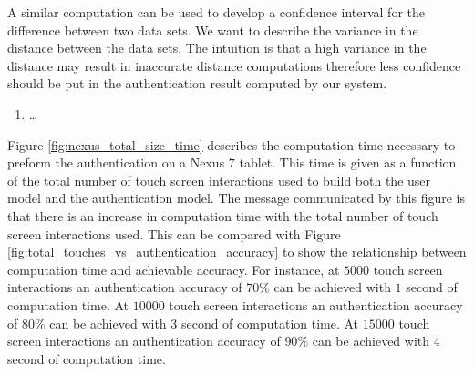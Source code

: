 A similar computation can be used to develop 
a confidence interval for the difference between two data sets.
%
We want to describe the variance in the distance 
between the data sets.
The intuition is that a high variance in the distance
may result in inaccurate distance computations therefore
less confidence should be put in the authentication result 
computed by our system.
%
\begin{enumerate}
\item \dots
\end{enumerate}



%
Figure \ref{fig:nexus_total_size_time} describes the
computation time necessary to preform the authentication on a Nexus $7$ tablet.
This time is given as a function of
the total number of touch screen interactions used to build
both the user model and the authentication model.
%
The message communicated by this figure is 
that there is an increase in computation time 
with the total number of touch screen interactions used.
%
This can be compared with 
Figure \ref{fig:total_touches_vs_authentication_accuracy}
to show the relationship between 
computation time and achievable accuracy.
%
For instance,
at $5000$ touch screen interactions an authentication accuracy of $70\%$
can be achieved with $1$ second of computation time.
At $10000$ touch screen interactions an authentication accuracy of $80\%$
can be achieved with $3$ second of computation time.
At $15000$ touch screen interactions an authentication accuracy of $90\%$
can be achieved with $4$ second of computation time.



